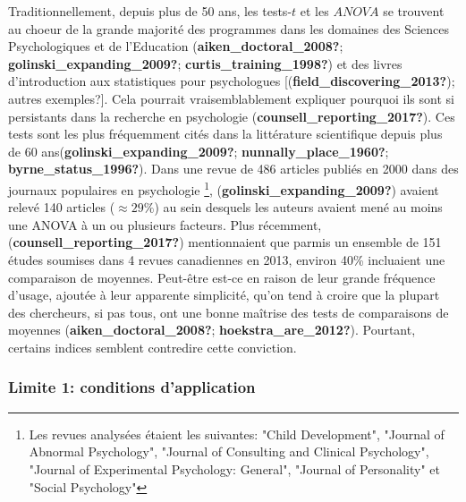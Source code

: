 \documentclass[
  english,
  man]{apa6}
\begin{document}
Traditionnellement, depuis plus de 50 ans, les tests-\(t\) et les \(ANOVA\) se trouvent au choeur de la grande majorité des programmes dans les domaines des Sciences Psychologiques et de l'Education (\textbf{aiken\_doctoral\_2008?}; \textbf{golinski\_expanding\_2009?}; \textbf{curtis\_training\_1998?}) et des livres d'introduction aux statistiques pour psychologues {[}(\textbf{field\_discovering\_2013?}); autres exemples?{]}. Cela pourrait vraisemblablement expliquer pourquoi ils sont si persistants dans la recherche en psychologie (\textbf{counsell\_reporting\_2017?}). Ces tests sont les plus fréquemment cités dans la littérature scientifique depuis plus de 60 ans(\textbf{golinski\_expanding\_2009?}; \textbf{nunnally\_place\_1960?}; \textbf{byrne\_status\_1996?}). Dans une revue de 486 articles publiés en 2000 dans des journaux populaires en psychologie \footnote{Les revues analysées étaient les suivantes: "Child Development", "Journal of Abnormal Psychology", "Journal of Consulting and Clinical Psychology", "Journal of Experimental Psychology: General", "Journal of Personality" et "Social Psychology"}, (\textbf{golinski\_expanding\_2009?}) avaient relevé 140 articles (\(\approx 29 \%\)) au sein desquels les auteurs avaient mené au moins une ANOVA à un ou plusieurs facteurs. Plus récemment, (\textbf{counsell\_reporting\_2017?}) mentionnaient que parmis un ensemble de 151 études soumises dans 4 revues canadiennes en 2013, environ 40\% incluaient une comparaison de moyennes. Peut-être est-ce en raison de leur grande fréquence d'usage, ajoutée à leur apparente simplicité, qu'on tend à croire que la plupart des chercheurs, si pas tous, ont une bonne maîtrise des tests de comparaisons de moyennes (\textbf{aiken\_doctoral\_2008?}; \textbf{hoekstra\_are\_2012?}). Pourtant, certains indices semblent contredire cette conviction.

\hypertarget{limite-1-conditions-dapplication}{%
\subsubsection{Limite 1: conditions d'application}\label{limite-1-conditions-dapplication}}
\end{document}
